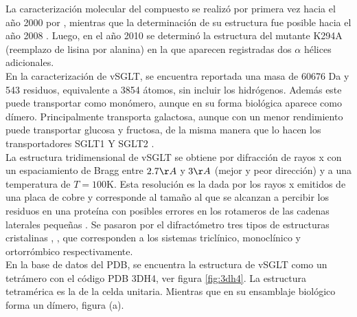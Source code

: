 La caracterizaci\'{o}n molecular del compuesto se realiz\'{o} por primera vez hacia el a\~{n}o 2000 por \cite{Turk2000}, mientras que la determinaci\'{o}n de su estructura fue posible hacia el a\~{n}o 2008 \cite{Faham2008}. Luego, en el a\~{n}o 2010 se determin\'{o} la estructura del mutante K294A (reemplazo de lisina por alanina) en la que aparecen registradas dos $\alpha$ h\'{e}lices adicionales.\\

En la caracterizaci\'{o}n de vSGLT, se encuentra reportada una  masa de 60676 Da y 543 residuos, equivalente a 3854 \'{a}tomos, sin incluir los hidr\'{o}genos. Adem\'{a}s este puede transportar como mon\'{o}mero,  aunque en su forma biol\'{o}gica aparece como d\'{i}mero. Principalmente transporta galactosa, aunque con un menor rendimiento puede transportar glucosa y fructosa, de la misma manera que lo hacen los transportadores SGLT1 Y SGLT2 \cite{SaierJr.}.\\

La estructura tridimensional de vSGLT \cite{Faham2008} se obtiene por difracci\'{o}n de rayos x con un espaciamiento de Bragg entre $2.7\AA$ y $3\AA$ (mejor y peor direcci\'{o}n) y  a una temperatura de $T=100$K. Esta  resoluci\'{o}n es la dada por los rayos x emitidos de una placa de cobre y corresponde al tama\~{n}o al que se alcanzan a percibir los residuos en una prote\'{i}na con posibles errores en los rotameros de las cadenas laterales peque\~{n}as \cite{Huang2007}. Se pasaron por el difract\'{o}metro tres tipos de estructuras cristalinas , ,   que corresponden a los sistemas tricl\'{i}nico, monocl\'{i}nico y ortorr\'{o}mbico respectivamente.\\

En la base de datos del PDB, se encuentra la estructura de vSGLT  como un tetr\'{a}mero con el c\'{o}digo PDB 3DH4, ver figura \ref{fig:3dh4}. La estructura tetram\'{e}rica es la de la celda unitaria. Mientras que en su ensamblaje biol\'{o}gico forma un d\'{i}mero, figura \label{fig:complejo} (a).

